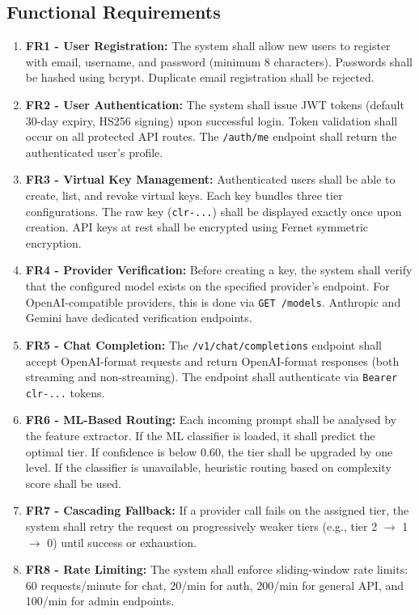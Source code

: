 \documentclass[12pt,a4paper]{report}
\begin{document}
\subsection{Functional Requirements}

\begin{enumerate}[nosep]
    \item \textbf{FR1 - User Registration:} The system shall allow new users to register with email, username, and password (minimum 8 characters). Passwords shall be hashed using bcrypt. Duplicate email registration shall be rejected.
    \item \textbf{FR2 - User Authentication:} The system shall issue JWT tokens (default 30-day expiry, HS256 signing) upon successful login. Token validation shall occur on all protected API routes. The \texttt{/auth/me} endpoint shall return the authenticated user's profile.
    \item \textbf{FR3 - Virtual Key Management:} Authenticated users shall be able to create, list, and revoke virtual keys. Each key bundles three tier configurations. The raw key (\texttt{clr-...}) shall be displayed exactly once upon creation. API keys at rest shall be encrypted using Fernet symmetric encryption.
    \item \textbf{FR4 - Provider Verification:} Before creating a key, the system shall verify that the configured model exists on the specified provider's endpoint. For OpenAI-compatible providers, this is done via \texttt{GET /models}. Anthropic and Gemini have dedicated verification endpoints.
    \item \textbf{FR5 - Chat Completion:} The \texttt{/v1/chat/completions} endpoint shall accept OpenAI-format requests and return OpenAI-format responses (both streaming and non-streaming). The endpoint shall authenticate via \texttt{Bearer clr-...} tokens.
    \item \textbf{FR6 - ML-Based Routing:} Each incoming prompt shall be analysed by the feature extractor. If the ML classifier is loaded, it shall predict the optimal tier. If confidence is below 0.60, the tier shall be upgraded by one level. If the classifier is unavailable, heuristic routing based on complexity score shall be used.
    \item \textbf{FR7 - Cascading Fallback:} If a provider call fails on the assigned tier, the system shall retry the request on progressively weaker tiers (e.g., tier 2 $\rightarrow$ 1 $\rightarrow$ 0) until success or exhaustion.
    \item \textbf{FR8 - Rate Limiting:} The system shall enforce sliding-window rate limits: 60 requests/minute for chat, 20/min for auth, 200/min for general API, and 100/min for admin endpoints.

\end{enumerate}
\end{document}
